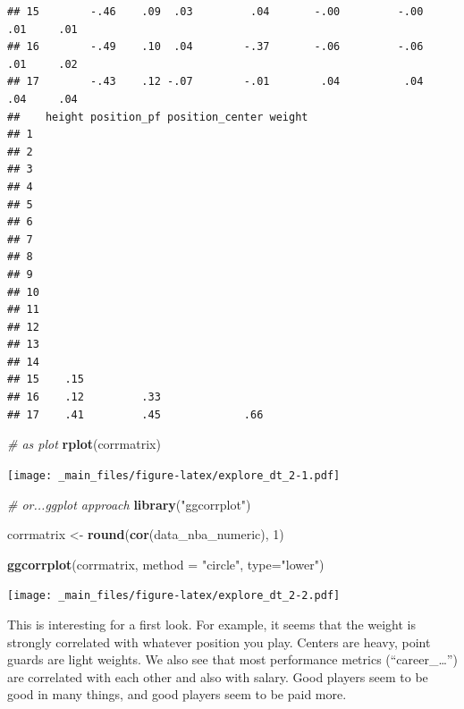 \documentclass[
]{book}
\newenvironment{Shaded}{\begin{snugshade}}{\end{snugshade}}
\newcommand{\AttributeTok}[1]{\textcolor[rgb]{0.13,0.29,0.53}{#1}}
\newcommand{\CommentTok}[1]{\textcolor[rgb]{0.56,0.35,0.01}{\textit{#1}}}
\newcommand{\DecValTok}[1]{\textcolor[rgb]{0.00,0.00,0.81}{#1}}
\newcommand{\FunctionTok}[1]{\textcolor[rgb]{0.13,0.29,0.53}{\textbf{#1}}}
\newcommand{\NormalTok}[1]{#1}
\newcommand{\OtherTok}[1]{\textcolor[rgb]{0.56,0.35,0.01}{#1}}
\newcommand{\StringTok}[1]{\textcolor[rgb]{0.31,0.60,0.02}{#1}}
\begin{document}
\begin{verbatim}
## 15        -.46    .09  .03         .04       -.00         -.00     .01     .01
## 16        -.49    .10  .04        -.37       -.06         -.06     .01     .02
## 17        -.43    .12 -.07        -.01        .04          .04     .04     .04
##    height position_pf position_center weight
## 1                                           
## 2                                           
## 3                                           
## 4                                           
## 5                                           
## 6                                           
## 7                                           
## 8                                           
## 9                                           
## 10                                          
## 11                                          
## 12                                          
## 13                                          
## 14                                          
## 15    .15                                   
## 16    .12         .33                       
## 17    .41         .45             .66
\end{verbatim}

\begin{Shaded}
\begin{Highlighting}[]
\CommentTok{\# as plot}
\FunctionTok{rplot}\NormalTok{(corrmatrix)}
\end{Highlighting}
\end{Shaded}

\texttt{[image: \_main\_files/figure-latex/explore\_dt\_2-1.pdf]}

\begin{Shaded}
\begin{Highlighting}[]
\CommentTok{\# or...ggplot approach}
\FunctionTok{library}\NormalTok{(}\StringTok{"ggcorrplot"}\NormalTok{)}

\NormalTok{corrmatrix }\OtherTok{\textless{}{-}} \FunctionTok{round}\NormalTok{(}\FunctionTok{cor}\NormalTok{(data\_nba\_numeric), }\DecValTok{1}\NormalTok{)}

\FunctionTok{ggcorrplot}\NormalTok{(corrmatrix,}
           \AttributeTok{method =} \StringTok{"circle"}\NormalTok{,}
           \AttributeTok{type=}\StringTok{"lower"}\NormalTok{)}
\end{Highlighting}
\end{Shaded}

\texttt{[image: \_main\_files/figure-latex/explore\_dt\_2-2.pdf]}

This is interesting for a first look. For example, it seems that the weight is
strongly correlated with whatever position you play. Centers are heavy, point
guards are light weights.
We also see that most performance metrics (``career\_\ldots{}'') are correlated with each
other and also with salary. Good players seem to be good in many things, and
good players seem to be paid more.
\end{document}

